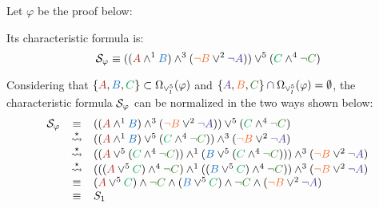 \begin{example}
\label{example:PlusTimesSwapNormalization}
Let $\varphi$ be the proof below:
\begin{prooftree}
		 
	 
						 
					 
					 
									 
								 
\end{prooftree}

\noindent
Its characteristic formula is:
$$
\struct{\varphi} 
\equiv 
((\hA{A} \structplus^1 \hB{B}) \structplus^3 (\hC{\structdual{B}} \structtimes^2 \hD{\structdual{A}}))
\structtimes^5
(\hE{C} \structplus^4 \hF{\structdual{C}})
$$

\noindent
Considering that $\{ \hA{A}, \hB{B}, \hE{C}\} \subset \occInference{\varphi}{\vee_l^5}$ and $\{ \hD{A}, \hC{B}, \hF{C} \} \cap \occInference{\varphi}{\vee_l^5} = \emptyset$, the characteristic formula $\struct{\varphi}$ can be normalized in the two ways shown below:
$$
\begin{array}{rcl}
\struct{\varphi} 
& \equiv &
((\hA{A} \structplus^1 \hB{B}) \structplus^3 (\hC{\structdual{B}} \structtimes^2 \hD{\structdual{A}}))
\structtimes^5
(\hE{C} \structplus^4 \hF{\structdual{C}}) \\
%
& \normalizePlusTimesS &
	((\hA{A} \structplus^1 \hB{B})\structtimes^5 (\hE{C} \structplus^4 \hF{\structdual{C}}))
\structplus^3 
	(\hC{\structdual{B}} \structtimes^2 \hD{\structdual{A}}) \\
%
& \normalizePlusTimesS &
((\hA{A} \structtimes^5
(\hE{C} \structplus^4 \hF{\structdual{C}})) \structplus^1 (\hB{B}\structtimes^5
(\hE{C} \structplus^4 \hF{\structdual{C}}))) \structplus^3 (\hC{\structdual{B}} \structtimes^2 \hD{\structdual{A}}) \\
%
& \normalizePlusTimesS &
(
		(
			(
				\hA{A} 
			\structtimes^5 
				\hE{C}
			) 
		\structplus^4 
			\hF{\structdual{C}}
		) 
	\structplus^1 
		(
			(
				\hB{B}
			\structtimes^5 
				\hE{C}
			) 
		\structplus^4 
			\hF{\structdual{C}}
		)
) 
\structplus^3 
(
	\hC{\structdual{B}} \structtimes^2 \hD{\structdual{A}}
) \\
& \equiv &	
	(
		\hA{A} 
	\structtimes^5 
		\hE{C}
	) 
\structplus 
	\hF{\structdual{C}}	 
\structplus 	
	(
		\hB{B}
	\structtimes^5 
		\hE{C}
	) 
\structplus 
	\hF{\structdual{C}}
\structplus 
(
	\hC{\structdual{B}} \structtimes^2 \hD{\structdual{A}}
) \\
& \equiv & S_1
\end{array}
$$


\end{example}
